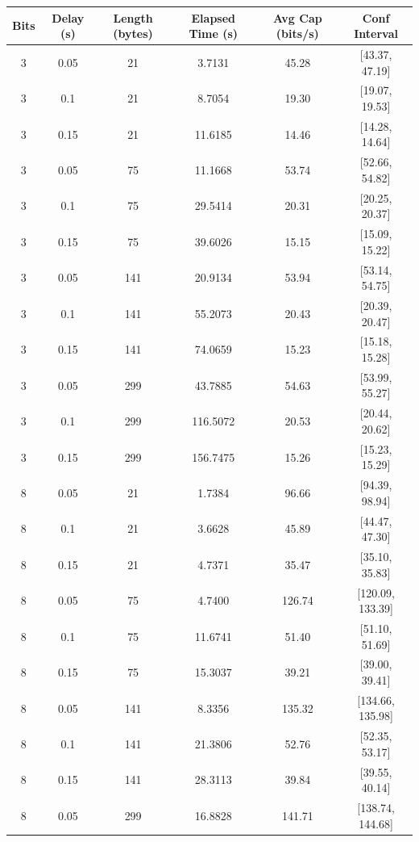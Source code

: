 \documentclass[10pt,a4paper]{article}
\begin{document}
\begin{table}[H]
    \centering
   \begin{tabular}{|c|c|c|c|c|c|}
    \hline
    \textbf{Bits} & \textbf{Delay (s)} & \textbf{Length (bytes)} & \textbf{Elapsed Time (s)} & \textbf{Avg Cap (bits/s)} & \textbf{Conf Interval} \\ \hline
    3 & 0.05 & 21 & 3.7131 & 45.28 & [43.37, 47.19] \\ \hline
    3 & 0.1 & 21 & 8.7054 & 19.30 & [19.07, 19.53] \\ \hline
    3 & 0.15 & 21 & 11.6185 & 14.46 & [14.28, 14.64] \\ \hline
    3 & 0.05 & 75 & 11.1668 & 53.74 & [52.66, 54.82] \\ \hline
    3 & 0.1 & 75 & 29.5414 & 20.31 & [20.25, 20.37] \\ \hline
    3 & 0.15 & 75 & 39.6026 & 15.15 & [15.09, 15.22] \\ \hline
    3 & 0.05 & 141 & 20.9134 & 53.94 & [53.14, 54.75] \\ \hline
    3 & 0.1 & 141 & 55.2073 & 20.43 & [20.39, 20.47] \\ \hline
    3 & 0.15 & 141 & 74.0659 & 15.23 & [15.18, 15.28] \\ \hline
    3 & 0.05 & 299 & 43.7885 & 54.63 & [53.99, 55.27] \\ \hline
    3 & 0.1 & 299 & 116.5072 & 20.53 & [20.44, 20.62] \\ \hline
    3 & 0.15 & 299 & 156.7475 & 15.26 & [15.23, 15.29] \\ \hline
    8 & 0.05 & 21 & 1.7384 & 96.66 & [94.39, 98.94] \\ \hline
    8 & 0.1 & 21 & 3.6628 & 45.89 & [44.47, 47.30] \\ \hline
    8 & 0.15 & 21 & 4.7371 & 35.47 & [35.10, 35.83] \\ \hline
    8 & 0.05 & 75 & 4.7400 & 126.74 & [120.09, 133.39] \\ \hline
    8 & 0.1 & 75 & 11.6741 & 51.40 & [51.10, 51.69] \\ \hline
    8 & 0.15 & 75 & 15.3037 & 39.21 & [39.00, 39.41] \\ \hline
    8 & 0.05 & 141 & 8.3356 & 135.32 & [134.66, 135.98] \\ \hline
    8 & 0.1 & 141 & 21.3806 & 52.76 & [52.35, 53.17] \\ \hline
    8 & 0.15 & 141 & 28.3113 & 39.84 & [39.55, 40.14] \\ \hline
    8 & 0.05 & 299 & 16.8828 & 141.71 & [138.74, 144.68] \\ \hline

\end{tabular}
\end{table}
\end{document}
